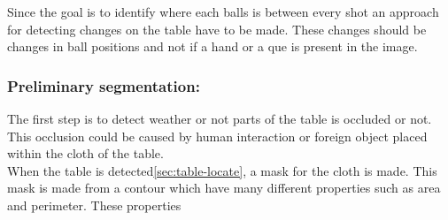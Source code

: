 Since the goal is to identify where each balls is between every shot an approach for detecting changes on the table have to be made. These changes should be changes in ball positions and not if a hand or a que is present in the image.

\subsubsection{Preliminary segmentation:}
The first step is to detect weather or not parts of the table is occluded or not. This occlusion could be caused by human interaction or foreign object placed within the cloth of the table.\\

When the table is detected\ref{sec:table-locate}, a mask for the cloth is made. This mask is made from a contour which have many different properties such as area and perimeter. These properties 

